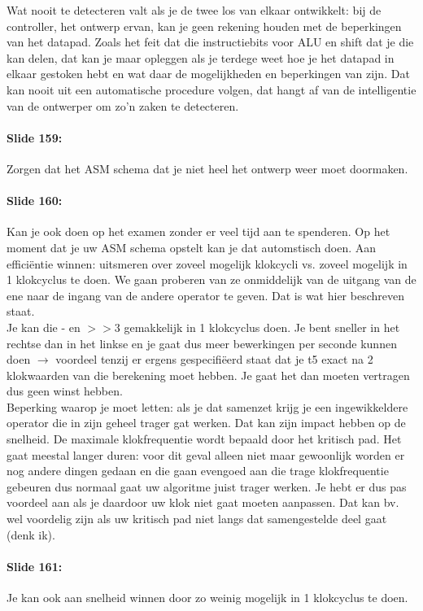 \documentclass[10pt,a4paper]{book}
\begin{document}
Wat nooit te detecteren valt als je de twee los van elkaar ontwikkelt: bij de controller, het ontwerp ervan, kan je geen rekening houden met de beperkingen van het datapad. Zoals het feit dat die instructiebits voor ALU en shift dat je die kan delen, dat kan je maar opleggen als je terdege weet hoe je het datapad in elkaar gestoken hebt en wat daar de mogelijkheden en beperkingen van zijn. Dat kan nooit uit een automatische procedure volgen, dat hangt af van de intelligentie van de ontwerper om zo'n zaken te detecteren.

\paragraph{Slide 159:} Zorgen dat het ASM schema dat je niet heel het ontwerp weer moet doormaken. 

\paragraph{Slide 160:} Kan je ook doen op het examen zonder er veel tijd aan te spenderen. Op het moment dat je uw ASM schema opstelt kan je dat automstisch doen. Aan effici\"entie winnen: uitsmeren over zoveel mogelijk klokcycli vs. zoveel mogelijk in 1 klokcyclus te doen. We gaan proberen van ze onmiddelijk van de uitgang van de ene naar de ingang van de andere operator te geven. Dat is wat hier beschreven staat.\\
Je kan die - en $>>3$ gemakkelijk in 1 klokcyclus doen. Je bent sneller in het rechtse dan in het linkse en je gaat dus meer bewerkingen per seconde kunnen doen $\rightarrow$ voordeel tenzij er ergens gespecifi\"eerd staat dat je t5 exact na 2 klokwaarden van die berekening moet hebben. Je gaat het dan moeten vertragen dus geen winst hebben.\\
Beperking waarop je moet letten: als je dat samenzet krijg je een ingewikkeldere operator die in zijn geheel trager gat werken. Dat kan zijn impact hebben op de snelheid. De maximale klokfrequentie wordt bepaald door het kritisch pad. Het gaat meestal langer duren: voor dit geval alleen niet maar gewoonlijk worden er nog andere dingen gedaan en die gaan evengoed aan die trage klokfrequentie gebeuren dus normaal gaat uw algoritme juist trager werken. Je hebt er dus pas voordeel aan als je daardoor uw klok niet gaat moeten aanpassen. Dat kan bv. wel voordelig zijn als uw kritisch pad niet langs dat samengestelde deel gaat (denk ik).

\paragraph{Slide 161:} Je kan ook aan snelheid winnen door zo weinig mogelijk in 1 klokcyclus te doen. 
\end{document}
